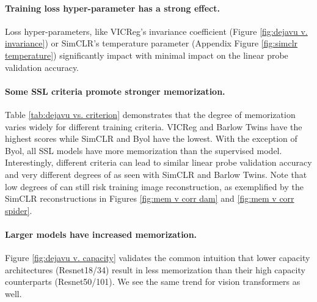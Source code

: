 \paragraph{Training loss hyper-parameter has a strong effect.} 
Loss hyper-parameters, like VICReg's invariance coefficient (Figure \ref{fig:dejavu v. invariance}) or SimCLR's temperature parameter (Appendix Figure \ref{fig:simclr temperature}) significantly impact \dejavu with minimal impact on the linear probe validation accuracy.

\vspace{-0.5em}
\paragraph{Some SSL criteria promote stronger \dejavu memorization.} Table \ref{tab:dejavu vs. criterion} demonstrates that the degree of memorization varies widely for different training criteria. VICReg and Barlow Twins have the highest \dejavu scores while SimCLR and Byol have the lowest.
With the exception of Byol, all SSL models have more \dejavu memorization than the supervised model. Interestingly, different criteria can lead to similar linear probe validation accuracy and very different degrees of \dejavu as seen with SimCLR and Barlow Twins. Note that low degrees of \dejavu can still risk training image reconstruction, as exemplified by the SimCLR reconstructions in Figures \ref{fig:mem v corr dam} and \ref{fig:mem v corr spider}. 
\vspace{-0.5em}
\paragraph{Larger models have increased \dejavu memorization.} Figure \ref{fig:dejavu v. capacity} validates the common intuition that lower capacity architectures (Resnet18/34) result in less memorization than their high capacity counterparts (Resnet50/101). 
We see the same trend for vision transformers as well. %
\vspace{-0.5em}

